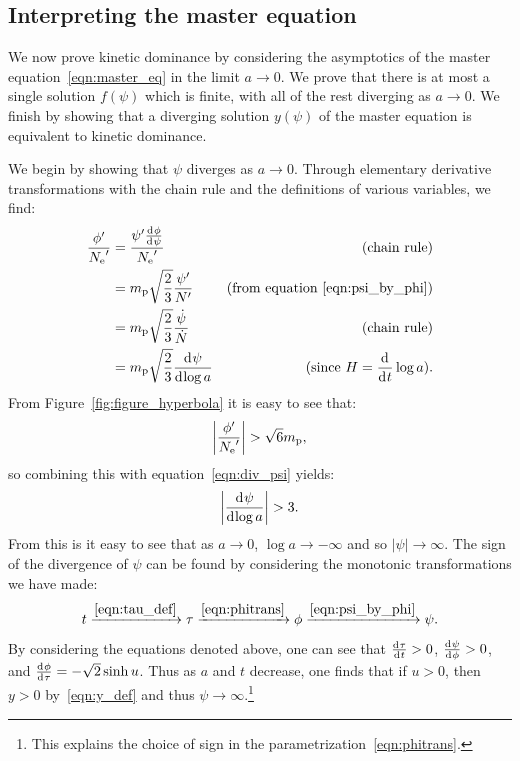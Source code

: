 \subsection{Interpreting the master equation}
\label{sec:interpreting_the_master_equation}

We now prove kinetic dominance by considering the asymptotics of the master equation~\eqref{eqn:master_eq} in the limit \(a\rightarrow0\). We prove that there is at most a single solution \(f(\psi)\) which is finite, with all of the rest diverging as \(a\rightarrow0\). We finish by showing that a diverging solution \(y(\psi)\) of the master equation is equivalent to kinetic dominance.

We begin by showing that \(\psi\) diverges as \(a\rightarrow0\). Through elementary derivative transformations with the chain rule and the definitions of various variables, we find:
%
\begin{align}
  \frac{{{\phi}^\prime}}{{{N_\mathrm{e}}^\prime}} 
  &=
  \frac{{{\psi}^\prime}\frac{\operatorname{d}^{}\!{\phi}}{\operatorname{d}^{}\!{\psi}}}{{{N_\mathrm{e}}^\prime}}
  &\text{(chain rule)} 
  \nonumber
  \\
  &=
  m_{\mathrm{p}}\sqrt{\frac{2}{3}}\frac{{{\psi}^\prime}}{{{N}^\prime}}  
  &\text{(from equation \protect\ref{eqn:psi_by_phi})} 
  \nonumber
  \\
  &=
  m_{\mathrm{p}}\sqrt{\frac{2}{3}}\frac{\dot\psi}{\dot{N}}  
  &\text{(chain rule)} 
  \nonumber
  \\
  &=
  m_{\mathrm{p}}\sqrt{\frac{2}{3}}\frac{\operatorname{d}^{}\!{\psi}}{\operatorname{d}^{}\!{\log a}}
  &\text{(since \(H=\frac{\operatorname{d}^{}\!{}}{\operatorname{d}^{}\!{t}}\log a\))}.
  \label{eqn:div_psi}
\end{align}
%
From Figure~\ref{fig:figure_hyperbola} it is easy to see that:
%
\begin{equation}
  \left|\frac{{{\phi}^\prime}}{{{N_\mathrm{e}}^\prime}}\right| > \sqrt{6}m_{\mathrm{p}}, 
\end{equation}
%
so combining this with equation~\eqref{eqn:div_psi} yields:
%
\begin{equation}
  \left|\frac{\operatorname{d}^{}\!{\psi}}{\operatorname{d}^{}\!{\log a}}\right| > 3. 
\end{equation}
%
From this is it easy to see that as \(a\to0\), \(\log a\to-\infty\) and so \(|\psi|\to\infty\). The sign of the divergence of \(\psi\) can be found by considering the monotonic transformations we have made: %
\begin{equation}
  t
  \xrightarrow{\protect\eqref{eqn:tau_def}}
  \tau
  \xrightarrow{\protect\eqref{eqn:phitrans}}
  \phi
  \xrightarrow{\protect\eqref{eqn:psi_by_phi}}
  \psi.
\end{equation}
%
By considering the equations denoted above, one can see that \(\frac{\operatorname{d}^{}\!{\tau}}{\operatorname{d}^{}\!{t}}>0\), \(\frac{\operatorname{d}^{}\!{\psi}}{\operatorname{d}^{}\!{\phi}}>0\), and \(\frac{\operatorname{d}^{}\!{\phi}}{\operatorname{d}^{}\!{\tau}} = -\sqrt{2}\sinh u\). Thus as \(a\) and \(t\) decrease, one finds that if \(u>0\), then \(y>0\) by~\eqref{eqn:y_def} and thus \(\psi\to\infty\).\footnote{This explains the choice of sign in the parametrization~\protect\eqref{eqn:phitrans}.}



